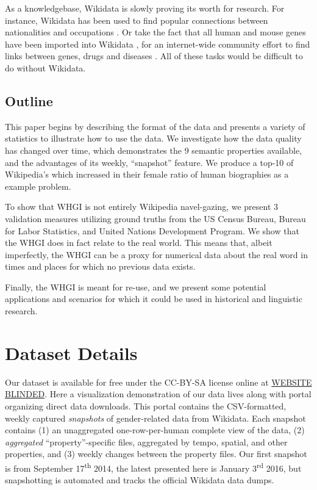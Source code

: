 \documentclass[letterpaper]{article}
\begin{document}
As a knowledgebase, Wikidata is slowly proving its worth for research. For instance, Wikidata has been used to find popular connections between nationalities and occupations \cite{goldfarb_quantifying_2015}. Or take the fact that all human and mouse genes have been imported into Wikidata \cite{mitraka_wikidata:_2015}, for an internet-wide community effort to find links between genes, drugs and diseases \cite{burgstaller-muehlbacher_wikidata_2015}. All of these tasks would be difficult to do without Wikidata.

\subsection{Outline}

This paper begins by describing the format of the data and presents a variety of statistics to illustrate how to use the data. We investigate how the data quality has changed over time, which demonstrates the 9 semantic properties available, and the advantages of its weekly, ``snapshot'' feature. We produce a top-10 of Wikipedia's which increased in their female ratio of human biographies as a example problem. 

To show that WHGI is not entirely Wikipedia navel-gazing, we present 3 validation measures utilizing ground truths from the US Census Bureau, Bureau for Labor Statistics, and United Nations Development Program. We show that the WHGI does in fact relate to the real world. This means that, albeit imperfectly, the WHGI can be a proxy for numerical data about the real word in times and places for which no previous data exists.

Finally, the WHGI is meant for re-use, and we present some potential applications and scenarios for which it could be used in historical and linguistic research.  

\section{Dataset Details}

Our dataset is available for free under the CC-BY-SA license online at  \url{WEBSITE BLINDED}. Here a visualization demonstration of our data lives along with portal organizing direct data downloads. 	This portal contains the CSV-formatted, weekly captured \textit{snapshots} of gender-related data from Wikidata. Each snapshot contains (1) an unaggregated one-row-per-human complete view of the data, (2) \textit{aggregated} ``property''-specific files, aggregated by tempo, spatial, and other properties, and (3) weekly changes between the property files. Our first snapshot is from September 17\textsuperscript{th} 2014, the latest presented here is January 3\textsuperscript{rd} 2016, but snapshotting is automated and tracks the official Wikidata data dumps.
\end{document}
